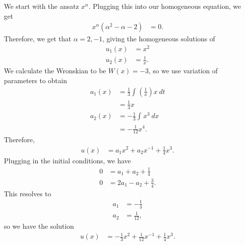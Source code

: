 \documentclass[10pt]{mypackage}
\begin{document}
\begin{solution}[39.18]
  We start with the ansatz $x^{\alpha}$. Plugging this into our homogeneous equation, we get
  \begin{align*}
    x^{\alpha}\left( \alpha^2 - \alpha - 2 \right) &= 0.
  \end{align*}
  Therefore, we get that $\alpha =2,-1$, giving the homogeneous solutions of
  \begin{align*}
    u_1(x) &= x^2\\
    u_2(x) &= \frac{1}{x}.
  \end{align*}
  We calculate the Wronskian to be $W(x) = -3$, so we use variation of parameters to obtain
  \begin{align*}
    a_1(x) &= \frac{1}{3} \int_{}^{} \left( \frac{1}{x} \right)x\:dt\\
           &= \frac{1}{3}x\\
    a_2(x) &= -\frac{1}{3} \int_{}^{} x^3\:dx\\
           &= -\frac{1}{12}x^4.
  \end{align*}
  Therefore,
  \begin{align*}
    u(x) &= a_1x^2 + a_2x^{-1} + \frac{1}{4}x^3.
  \end{align*}
  Plugging in the initial conditions, we have
  \begin{align*}
    0 &= a_1 + a_2 + \frac{1}{4}\\
    0 &= 2a_1 - a_2 + \frac{3}{4}.
  \end{align*}
  This resolves to
  \begin{align*}
    a_1 &= -\frac{1}{3}\\
    a_2 &= \frac{1}{12},
  \end{align*}
  so we have the solution
  \begin{align*}
    u(x) &= -\frac{1}{3}x^2 + \frac{1}{12}x^{-1} + \frac{1}{4}x^3.
  \end{align*}
\end{solution}
\begin{solution}[39.21]

\end{solution}
\begin{solution}[39.22 (b)]

\end{solution}
\end{document}
